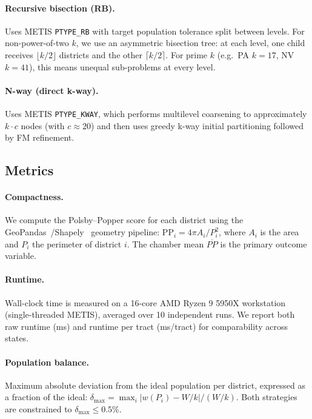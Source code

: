 \paragraph{Recursive bisection (RB).} Uses METIS \texttt{PTYPE\_RB} with
target population tolerance split between levels.
For non-power-of-two $k$, we use an asymmetric bisection tree:
at each level, one child receives $\lfloor k/2 \rfloor$ districts and
the other $\lceil k/2 \rceil$.
For prime $k$ (e.g.\ PA $k{=}17$, NV $k{=}41$), this means unequal
sub-problems at every level.

\paragraph{N-way (direct k-way).} Uses METIS \texttt{PTYPE\_KWAY}, which
performs multilevel coarsening to approximately $k \cdot c$ nodes (with
$c \approx 20$) and then uses greedy k-way initial partitioning followed
by FM refinement.

\subsection{Metrics}

\paragraph{Compactness.}
We compute the Polsby--Popper score for each district using the
GeoPandas~\citep{geopandas}/Shapely~\citep{shapely} geometry pipeline:
$\mathrm{PP}_i = 4\pi A_i / P_i^2$,
where $A_i$ is the area and $P_i$ the perimeter of district $i$.
The chamber mean $\overline{PP}$ is the primary outcome variable.

\paragraph{Runtime.}
Wall-clock time is measured on a 16-core AMD Ryzen 9 5950X workstation
(single-threaded METIS), averaged over 10 independent runs.
We report both raw runtime (ms) and runtime per tract (ms/tract) for
comparability across states.

\paragraph{Population balance.}
Maximum absolute deviation from the ideal population per district,
expressed as a fraction of the ideal: $\delta_{\max} = \max_i |w(P_i) - W/k| / (W/k)$.
Both strategies are constrained to $\delta_{\max} \leq 0.5\%$.


